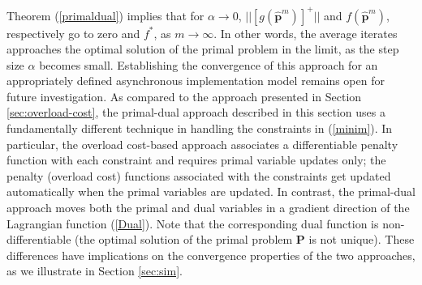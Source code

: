 \documentclass[12pt,draftcls,onecolumn]{IEEEtran}
\begin{document}
\indent Theorem (\ref{primaldual}) implies that for $\alpha \rightarrow 0$, $||[g(\hat{\mathbf{p}}^{m})]^{+}||$ and $f(\hat{\mathbf{p}}^{m})$, respectively go to zero and $f^{*}$, as $m \rightarrow \infty$. In other words, the average iterates approaches the optimal solution of the primal problem in the limit, as the step size $\alpha$ becomes small. Establishing the convergence of this approach for an appropriately defined asynchronous implementation model remains open for future investigation. As compared to the approach presented in Section \ref{sec:overload-cost}, the primal-dual approach described in this section uses a fundamentally different technique in handling the constraints in (\ref{minim}). In particular, the overload cost-based approach associates a differentiable penalty function with each constraint and requires primal variable updates only; the penalty (overload cost) functions associated with the constraints get updated automatically when the primal variables are updated. In contrast, the primal-dual approach moves both the primal and dual variables in a gradient direction of the Lagrangian function (\ref{Dual}). Note that the corresponding dual function is non-differentiable (the optimal solution of the primal problem $\mathbf{P}$ is not unique). These differences have implications on the convergence properties of the two approaches, as we illustrate in Section \ref{sec:sim}.
\end{document}
